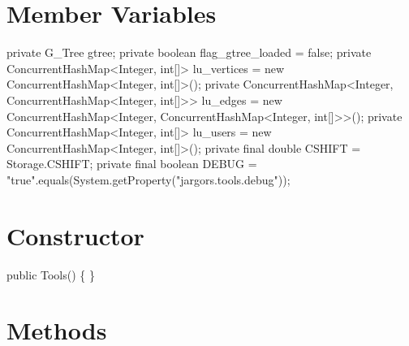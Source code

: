 \section{Member Variables}
\nwenddocs{}\endmoddef{}
private G_Tree gtree;
private boolean flag_gtree_loaded = false;
private ConcurrentHashMap<Integer, int[]> lu_vertices = new ConcurrentHashMap<Integer, int[]>();
private ConcurrentHashMap<Integer,
    ConcurrentHashMap<Integer, int[]>>    lu_edges    = new ConcurrentHashMap<Integer, ConcurrentHashMap<Integer, int[]>>();
private ConcurrentHashMap<Integer, int[]> lu_users    = new ConcurrentHashMap<Integer, int[]>();
private final double CSHIFT = Storage.CSHIFT;
private final boolean DEBUG = "true".equals(System.getProperty("jargors.tools.debug"));
\nwendcode{}\nwdocspar

\section{Constructor}
\nwenddocs{}\endmoddef{}
public Tools() \{ \}
\nwendcode{}\nwdocspar

\section{Methods}

